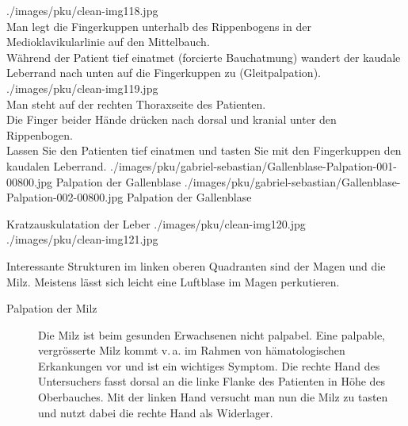 \begin{PictureSeries}{}{}
{./images/pku/clean-img118.jpg}
{
\\
Man legt die Fingerkuppen \CM* unterhalb des
Rippenbogens in der Medioklavikularlinie auf den Mittelbauch.
\\
Während der Patient tief einatmet (forcierte Bauchatmung) wandert der
kaudale Leberrand nach unten auf die Fingerkuppen zu (Gleitpalpation).}
{./images/pku/clean-img119.jpg}
{
\\
Man steht auf der rechten Thoraxseite des Patienten.
\\
Die Finger beider Hände drücken nach dorsal und kranial unter den
Rippenbogen.
\\
Lassen Sie den Patienten tief einatmen und tasten Sie mit den
Fingerkuppen den kaudalen Leberrand.}
{}
{}
{}
{}
{./images/pku/gabriel-sebastian/Gallenblase-Palpation-001-00800.jpg}
{Palpation der Gallenblase}
{./images/pku/gabriel-sebastian/Gallenblase-Palpation-002-00800.jpg}
{Palpation der Gallenblase}
{}
{}
{}
{}
\end{PictureSeries}

\begin{PictureSeries}{}{Kratzauskulatation der Leber}
{./images/pku/clean-img120.jpg}
{}
{./images/pku/clean-img121.jpg}
{}
{}
{}
{}
{}
\end{PictureSeries}

{Interessante Strukturen im linken oberen Quadranten sind
der Magen und die Milz. Meistens lässt sich leicht eine
Luftblase im Magen perkutieren. 
\begin{description}
  \item[Palpation der Milz]
Die Milz ist beim gesunden Erwachsenen
nicht palpabel. Eine palpable, vergrösserte Milz kommt
v.\,a. im Rahmen von hämatologischen Erkankungen vor und ist
ein wichtiges Symptom.
Die rechte Hand des Untersuchers fasst dorsal an die linke
Flanke des Patienten in Höhe des Oberbauches. Mit der linken
Hand versucht man nun die Milz zu tasten und nutzt dabei
die rechte Hand als Widerlager.
\end{description}

}
{
\begin{PkuBefunde}[]
  \item[\SymbolPkuNormal] 
\end{PkuBefunde} 
}
{}
{}
{}

